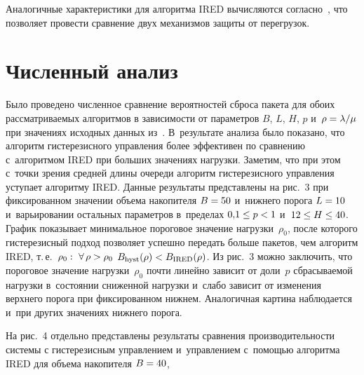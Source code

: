 \begin{multicols}{2}
  Аналогичные характеристики для алгоритма IRED вычисляются согласно~\cite{5-al}, 
что позволяет провести сравнение двух механизмов защиты от перегрузок.

\vspace*{-6pt}
  
\section{Численный анализ}

\vspace*{-3pt}

  Было проведено численное сравнение вероятностей сброса пакета для обоих 
рассматриваемых алгоритмов в зависимости от параметров $B$, $L$, $H$, $p$ и~$\rho\hm=\lambda/\mu$ при 
значениях исходных данных из~\cite{5-al}. В~результате анализа было показано, что 
алгоритм гистерезисного управ\-ле\-ния более эффективен по сравнению с~алгоритмом IRED 
при больших значениях нагрузки. Заметим, что при этом с~точ\-ки зрения средней длины 
очереди алгоритм гистерезисного управ\-ле\-ния уступает алгоритму IRED. Данные 
результаты пред\-став\-ле\-ны на рис.~3 при фиксированном значении объема накопителя 
$B\hm=50$ и~нижнего порога $L\hm=10$ и~варьировании остальных па\-ра\-мет\-ров 
в~пределах $0{,}1\hm\leq p\hm < 1$ и~$12\hm\leq H\hm\leq 40$. График показывает 
минимальное пороговое значение нагрузки~$\rho_0$, после которого гистерезисный подход 
позволяет успешно передать больше пакетов, чем алгоритм IRED, т.\,е.\ $\rho_0:\ 
\forall\,\rho \hm> \rho_0$ $B_{\mathrm{hyst}}(\rho)\hm< B_{\mathrm{IRED}}(\rho)$. Из рис.~3 можно заключить, 
что пороговое значение нагрузки~$\rho_0$ почти линейно зависит от доли~$p$ 
сбрасываемой нагрузки в~со\-сто\-янии сниженной на\-груз\-ки и~слабо зависит от изменения 
верхнего порога при фиксированном нижнем. Аналогичная картина наблюдается и~при 
других значениях нижнего порога.
  
   На рис.~4 отдельно представлены результаты сравнения производительности сис\-те\-мы 
с гистерезисным управ\-ле\-ни\-ем и~управ\-ле\-ни\-ем с~по\-мощью алгоритма IRED для объема 
накопителя $B\hm=40$,\linebreak\vspace*{-12pt}

\pagebreak

\end{multicols}

\begin{figure*} %
\vspace*{1pt}
  \begin{center}  
    \mbox{%
\epsfxsize=89.36mm
}

\end{center}
\vspace*{-6pt}
\vspace*{9pt}
\end{figure*}

